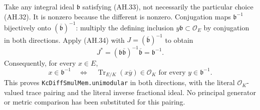 Take any integral ideal $\mathfrak b$ satisfying (AH.33), not necessarily
the particular choice (AH.32). It is nonzero because the different is
nonzero. Conjugation maps $\mathfrak b^{-1}$ bijectively onto
$(\overline{\mathfrak b})^{-1}$: multiply the defining inclusion
$y\mathfrak b\subset\mathcal O_E$ by conjugation in both directions.
Apply (AH.34) with $J=(\overline{\mathfrak b})^{-1}$ to obtain
\[
 J^*=(\mathfrak b\overline{\mathfrak b})^{-1}
             \overline{\mathfrak b}=\mathfrak b^{-1}.
\]
Consequently, for every $x\in E$,
\[
 x\in\mathfrak b^{-1}
 \quad\Longleftrightarrow\quad
 \operatorname{Tr}_{E/K}(x\overline y)\in\mathcal O_K
                 \text{ for every }y\in\mathfrak b^{-1}.        \tag{AH.35}
\]
This proves \texttt{KcDiffSmulMem.unimodular} in both directions, with
the literal $\mathcal O_K$-valued trace pairing and the literal inverse
fractional ideal. No principal generator or metric comparison has been
substituted for this pairing.

